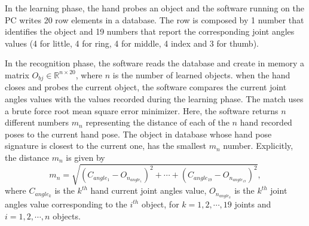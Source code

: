 In the learning phase, the hand probes an object and the software running on the PC writes 20 row elements in a database. The row is composed by 1 number that identifies the object and 19 numbers that report the corresponding joint angles values (4 for little, 4 for ring, 4 for middle, 4 index and 3 for thumb).

In the recognition phase, the software reads the database and create in memory a matrix $O_{bj} \in \mathbb{R}^{n \times 20}$, where $n$ is the number of learned objects. when the hand closes and probes the current object, the software compares the current joint angles values with the values recorded during the learning phase. The match uses a brute force root mean square error minimizer. Here, the software returns $n$ different numbers $m_n$ representing the distance of each of the $n$ hand recorded poses to the current hand pose. The object in database whose hand pose signature is closest to the current one, has the smallest $m_n$ number. Explicitly, the distance $m_n$ is given by
\begin{equation}
m_n = \sqrt{(C_{angle_{1}} - O_{n_{angle_{1}}})^2 + \cdots + (C_{angle_{19}} - O_{n_{angle_{19}}})^2 },
\end{equation}
where $C_{angle_{k}}$ is the $k^{th}$ hand current joint angles value, $O_{n_{angle_{k}}}$ is the $k^{th}$ joint angles value corresponding to the $i^{th}$ object, for $k=1, 2 , \cdots , 19$ joints and $i=1,2, \cdots, n$ objects.


